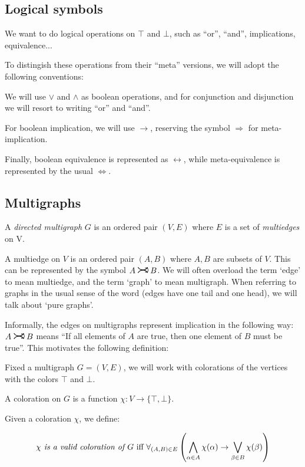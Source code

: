 \documentclass[11pt]{article}
\newcommand{\rightcurvearrow}{
\mathrel{
  \begin{tikzpicture}[scale=0.8]
    \draw[thick,->] (0,1ex) arc (30:150:-2ex);
    \draw[thick,->] (0,-1ex) arc (150:30:2ex);
  \end{tikzpicture}
}
}
\begin{document}
\subsection{Logical symbols}

We want to do logical operations on $\top$ and $\bot$, such as ``or'', ``and'', implications, equivalence...

To distingish these operations from their ``meta'' versions, we will adopt the following conventions:

We will use $\vee$ and $\wedge$ as boolean operations, and for conjunction and disjunction we will resort to writing ``or'' and ``and''.

For boolean implication, we will use $\rightarrow$, reserving the symbol $\Rightarrow$ for meta-implication.

Finally, boolean equivalence is represented as $\leftrightarrow$, while meta-equivalence is represented by the usual $\Leftrightarrow$.


\subsection{Multigraphs}

A \emph{directed multigraph} $G$ is an ordered pair $(V, E)$ where $E$ is a set of \emph{multiedges} on V.

A multiedge on $V$ is an ordered pair $(A, B)$ where $A, B$ are subsets of $V$. This can be represented by the symbol $A \rightcurvearrow B$. We will often overload the term `edge' to mean multiedge, and the term `graph' to mean multigraph. When referring to graphs in the usual sense of the word (edges have one tail and one head), we will talk about `pure graphs'.

Informally, the edges on multigraphs represent implication in the following way: $A \rightcurvearrow B$ means ``If all elements of $A$ are true, then one element of $B$ must be true''. This motivates the following definition:

Fixed a multigraph $G = (V,E)$, we will work with colorations of the vertices with the colors $\top$ and $\bot$.

A coloration on $G$ is a function $\chi : V \rightarrow \{\top, \bot\}$.

Given a coloration $\chi$, we define:

\[ \chi \text{\emph{ is a valid coloration of $G$} iff } \forall_{(A,B) \in E} \left( \bigwedge_{\alpha \in A} \chi(\alpha) \rightarrow \bigvee_{\beta \in B} \chi(\beta) \right)\]
\end{document}
